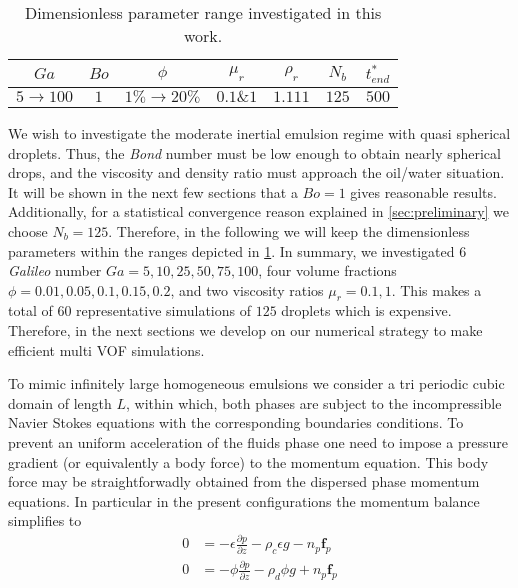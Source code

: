 \begin{table}[h!]
    \centering
    \caption{Dimensionless parameter range investigated in this work.}
    \begin{tabular}{ccccccc}\hline
        $Ga$&$Bo$&$\phi$&$\mu_r$&$\rho_r$&$N_b$&$t^*_{end}$\\ \hline\hline
        $5\rightarrow 100$&$1$&$1\% \rightarrow 20\%$&$0.1 \& 1$&$1.111$&$125$&$500$\\ \hline
    \end{tabular}
    \label{tab:parameters}
\end{table}

We wish to investigate the moderate inertial emulsion regime with quasi spherical droplets. 
Thus, the \textit{Bond} number must be low enough to obtain nearly spherical drops, and the viscosity and density ratio must approach the oil/water situation. 
It will be shown in the next few sections that a $Bo =1$ gives reasonable results. 
Additionally, for a statistical convergence reason explained in \ref{sec:preliminary} we choose $N_b = 125$. 
Therefore, in the following we will keep the dimensionless parameters within the ranges depicted in \ref{tab:parameters}.
In summary, we investigated $6$ \textit{Galileo} number $Ga = 5,10,25,50,75,100$, four volume fractions $\phi = 0.01,0.05,0.1,0.15,0.2$, and two viscosity ratios $\mu_r =0.1,1$. 
This makes a total of $60$ representative simulations of $125$ droplets which is expensive. 
Therefore, in the next sections we develop on our numerical strategy to make efficient multi VOF simulations. 


To mimic infinitely large homogeneous emulsions we consider a tri periodic cubic domain of length $L$, within which, both phases are subject to the incompressible Navier Stokes equations with the corresponding boundaries conditions. To prevent an uniform acceleration of the fluids phase one need to impose a pressure gradient (or equivalently a body force) to the momentum equation. This body force may be straightforwadly obtained from the dispersed phase momentum equations. In particular in the present configurations the momentum balance simplifies to
\begin{align}
0 &= -\epsilon\frac{\partial p}{\partial z} - \rho_c \epsilon g - n_p \textbf{f}_p 
    \\
0 &= -\phi\frac{\partial p}{\partial z}     - \rho_d \phi g + n_p \textbf{f}_p 
\end{align}

